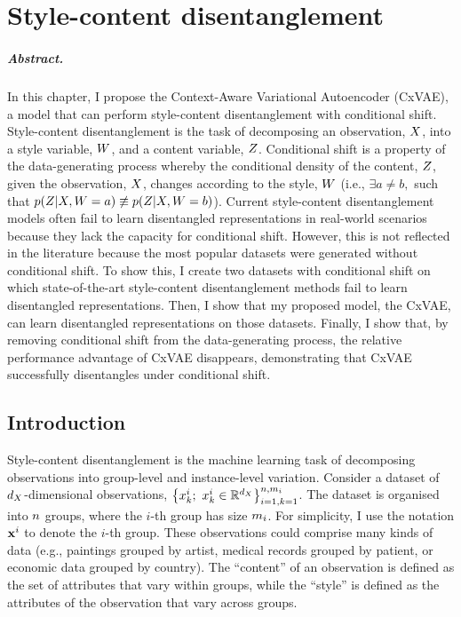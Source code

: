 \documentclass[../thesis.tex]{subfiles}
\begin{document}
\chapter{Style-content disentanglement}

\paragraph{Abstract.} In this chapter, I propose the Context-Aware Variational Autoencoder (CxVAE), a model that can perform style-content disentanglement with conditional shift. Style-content disentanglement is the task of decomposing an observation, $\myrv{x}$, into a style variable, $\myrv{w}$, and a content variable, $\myrv{z}$. Conditional shift is a property of the data-generating process whereby the conditional density of the content, $\myrv{z}$, given the observation, $\myrv{x}$, changes according to the style, $\myrv{w}$ (i.e., $\exists a \neq b,$ such that $\myfunc{p}(\myrv{z} | \myrv{x}, \myrv{w}=a) \not\equiv \myfunc{p}(\myrv{z} | \myrv{x}, \myrv{w}=b)$). Current style-content disentanglement models often fail to learn disentangled representations in real-world scenarios because they lack the capacity for conditional shift. However, this is not reflected in the literature because the most popular datasets were generated without conditional shift. To show this, I create two datasets with conditional shift on which state-of-the-art style-content disentanglement methods fail to learn disentangled representations. Then, I show that my proposed model, the CxVAE, can learn disentangled representations on those datasets. Finally, I show that, by removing conditional shift from the data-generating process, the relative performance advantage of CxVAE disappears, demonstrating that CxVAE successfully disentangles under conditional shift.

\section{Introduction}
\label{intro}
      
Style-content disentanglement is the machine learning task of decomposing observations into group-level and instance-level variation. Consider a dataset of $\mydim{x}$-dimensional observations, $\left\{ \myvect{x}^i_{k}; ~ \myvect{x}^i_{k} \in \mathbb{R}^{\mydim{x}} \right\}_{i=1,k=1}^{\mycnt{n}, \mycnt{m}_i}$. The dataset is organised into $n$ groups, where the $i$-th group has size $m_i$. For simplicity, I use the notation $\mathbf{{x}}^i$ to denote the $i$-th group. These observations could comprise many kinds of data (e.g., paintings grouped by artist, medical records grouped by patient, or economic data grouped by country). The ``content'' of an observation is defined as the set of attributes that vary within groups, while the ``style'' is defined as the attributes of the observation that vary across groups. 
\end{document}

